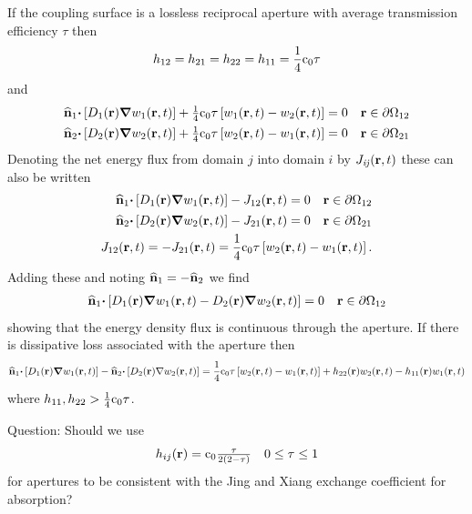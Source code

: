 \documentclass[a4paper]{article}
\numberwithin{equation}{section}
\begin{document}
If the coupling surface is a lossless reciprocal aperture with average
transmission efficiency $\tau$ then
\begin{align}
h_{12} = h_{21} = h_{22} = h_{11} = \frac{1}{4}\rc_0\tau
\end{align}
and
\begin{align}
\begin{matrix}
\uvn_1{\vcdot}\left[D_1\pr{\vnabla}w_1\prt\right]+\frac{1}{4}\rc_0\tau\left[w_1\prt-w_2\prt\right]=0 &\vr\in\partial\Omega_{12}
\end{matrix}\\
\begin{matrix}
\uvn_2{\vcdot}\left[D_2\pr{\vnabla}w_2\prt\right]+\frac{1}{4}\rc_0\tau\left[w_2\prt-w_1\prt\right]=0 &\vr\in\partial\Omega_{21}
\end{matrix}\\
\end{align}
Denoting the net energy flux from domain $j$ into domain $i$ by 
$J_{\mathit{ij}}\prt$ these can also be written
\begin{align}
\begin{matrix}
\uvn_1{\vcdot}\left[D_1\pr{\vnabla}w_1\prt\right]-J_{12}\prt=0 &\vr\in\partial\Omega_{12}
\end{matrix}\\
\begin{matrix}
\uvn_2{\vcdot}\left[D_2\pr{\vnabla}w_2\prt\right]-J_{21}\prt=0 &\vr\in\partial\Omega_{21}
\end{matrix}\\
J_{12}\prt = -J_{21}\prt = \frac{1}{4}\rc_0\tau\left[w_2\prt-w_1\prt\right].
\end{align}
Adding these and noting $\uvn_1=-\uvn_2$ we find
\begin{align}
\begin{matrix}
\uvn_1{\vcdot}\left[D_1\pr{\vnabla}w_1\prt-D_2\pr{\vnabla}w_2\prt\right]=0 &\vr\in\partial\Omega_{12}
\end{matrix}
\end{align}
showing that the energy density flux is continuous through the aperture. If
there is dissipative loss associated with the aperture then
\begin{align}
\uvn_1{\vcdot}\left[D_1\pr{\vnabla}w_1\prt\right]-\uvn_2{\vcdot}\left[D_2\pr{\nabla}w_2\prt\right]=\frac{1}{4}\rc_0\tau
\left[w_2\prt-w_1\prt\right]+h_{22}\pr w_2\prt-h_{11}\pr w_1\prt
\end{align}
where $h_{11},h_{22}>\frac{1}{4}\rc_0\tau$.

{\color{red}
Question: Should we use
\begin{align}
\begin{matrix}
h_{ij}\pr = \rc_0\frac{\tau}{2\left(2-\tau\right)} &0\leq\tau\leq 1
\end{matrix}
\end{align}
for apertures to be consistent with the Jing and Xiang exchange coefficient for
absorption? 
}
\end{document}
